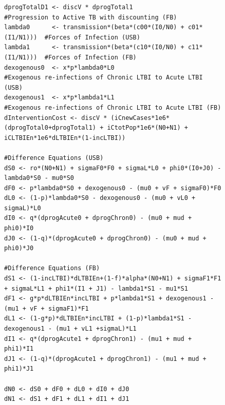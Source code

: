 \documentclass{amsart}
\begin{document}
\begin{figure}[h]
\begin{center}
{\begin{verbatim}
dprogTotalD1 <- discV * dprogTotal1                              #Progression to Active TB with discounting (FB)
lambda0      <- transmission*(beta*(c00*(I0/N0) + c01*(I1/N1)))  #Forces of Infection (USB)
lambda1      <- transmission*(beta*(c10*(I0/N0) + c11*(I1/N1)))  #Forces of Infection (FB)
dexogenous0	 <- x*p*lambda0*L0                                   #Exogenous re-infections of Chronic LTBI to Acute LTBI (USB)
dexogenous1  <- x*p*lambda1*L1                                   #Exogenous re-infections of Chronic LTBI to Acute LTBI (FB)
dInterventionCost <- discV * (iCnewCases*1e6*(dprogTotal0+dprogTotal1) + iCtotPop*1e6*(N0+N1) + iCLTBIEn*1e6*dLTBIEn*(1-incLTBI))

#Difference Equations (USB)
dS0 <- ro*(N0+N1) + sigmaF0*F0 + sigmaL*L0 + phi0*(I0+J0) - lambda0*S0 - mu0*S0
dF0 <- p*lambda0*S0 + dexogenous0 - (mu0 + vF + sigmaF0)*F0
dL0 <- (1-p)*lambda0*S0 - dexogenous0 - (mu0 + vL0 + sigmaL)*L0
dI0 <- q*(dprogAcute0 + dprogChron0) - (mu0 + mud + phi0)*I0
dJ0 <- (1-q)*(dprogAcute0 + dprogChron0) - (mu0 + mud + phi0)*J0

#Difference Equations (FB)
dS1 <- (1-incLTBI)*dLTBIEn+(1-f)*alpha*(N0+N1) + sigmaF1*F1 + sigmaL*L1 + phi1*(I1 + J1) - lambda1*S1 - mu1*S1
dF1 <- g*p*dLTBIEn*incLTBI + p*lambda1*S1 + dexogenous1 - (mu1 + vF + sigmaF1)*F1
dL1 <- (1-g*p)*dLTBIEn*incLTBI + (1-p)*lambda1*S1 - dexogenous1 - (mu1 + vL1 +sigmaL)*L1
dI1 <- q*(dprogAcute1 + dprogChron1) - (mu1 + mud + phi1)*I1
dJ1 <- (1-q)*(dprogAcute1 + dprogChron1) - (mu1 + mud + phi1)*J1

dN0 <- dS0 + dF0 + dL0 + dI0 + dJ0
dN1 <- dS1 + dF1 + dL1 + dI1 + dJ1


\end{verbatim}}
\end{center}
\end{figure}
\end{document}
